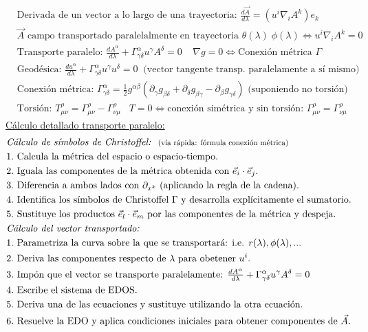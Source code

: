 \begin{align*}
        &\text{Derivada de un vector a lo largo de una trayectoria: } \tfrac{d \vec{A}}{d\lambda}=(u^i\nabla_iA^k)e_k\\
    &\vec{A}\text{ campo transportado paralelalmente en trayectoria } \theta(\lambda)\; \phi(\lambda) \Leftrightarrow u^i\nabla_i A^k=0\\
    &\text{Transporte paralelo: } \tfrac{d A^\alpha}{d\lambda}+ \Gamma^\alpha_{\gamma \delta} u^\gamma A^\delta = 0 \; \;\; \; \nabla g=0\Leftrightarrow  \text{Conexión métrica }\Gamma\\
    &\text{Geodésica: } \tfrac{d u^\alpha}{d\lambda}+ \Gamma^\alpha_{\gamma \delta} u^\gamma u^\delta \!=\! 0\;\;\text{(vector tangente transp. paralelamente a sí mismo)} \\
    &\text{Conexión métrica: }
    \Gamma_{\gamma \delta}^\alpha = \frac{1}{2}g^{\alpha \beta }(\partial_\gamma g_{\beta \delta}+\partial_\delta g_{\beta \gamma}-\partial_{\beta} g_{\gamma\delta}) \text{ (suponiendo no torsión)}\\
    &\text{Torsión: } T_{\mu \nu }^\rho = \Gamma_{\mu \nu }^\rho - \Gamma_{\nu \mu }^\rho \; \; \; T=0 \Leftrightarrow \text{conexión simétrica y sin torsión: }  \Gamma_{\mu \nu}^\rho = \Gamma _{\nu \mu} ^\rho 
 \end{align*}
 \underline{Cálculo detallado transporte paralelo:} 
 \begin{align*}
&\text{\textit{Cálculo de símbolos de Christoffel: \;}\scalebox{0.8}{(vía rápida: fórmula conexión métrica)} }\\
&1. \text{ Calcula la métrica del espacio o espacio-tiempo.}\\
&2. \text{ Iguala las componentes de la métrica obtenida con  $\vec{e}_i \cdot \vec{e}_j$.}\\
&3. \text{ Diferencia a ambos lados con $\partial_{x^k}$ (aplicando la regla de la cadena).}\\
&4. \text{ Identifica los símbolos de Christoffel $\Gamma$ y desarrolla explícitamente el sumatorio.}\\
&5. \text{ Sustituye los productos $\vec{e}_l\cdot\vec{e}_m$ por las componentes de la métrica y despeja.}\\
&\text{\textit{Cálculo del vector transportado:}}\\
&1. \text{ Parametriza la curva sobre la que se transportará: i.e. $r(\lambda), \phi(\lambda),...
$}\\
&2. \text{ Deriva las componentes respecto de $\lambda$ para obetener $u^i$.}\\
&3. \text{ Impón que el vector se transporte paralelamente: }\tfrac{d A^\alpha}{d\lambda}+ \Gamma^\alpha_{\gamma \delta} u^\gamma A^\delta = 0\\
&4. \text{ Escribe el sistema de EDOS.}\\
&5. \text{ Deriva una de las ecuaciones y sustituye utilizando la otra ecuación.}\\
&6. \text{ Resuelve la EDO y aplica condiciones iniciales para obtener componentes de } \vec{A}.
\end{align*}
